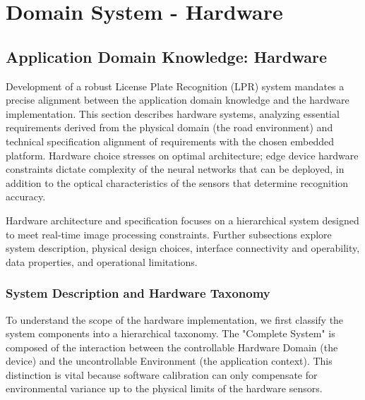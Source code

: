 %
\chapter{Domain System - Hardware} \label{ch:domain_system_hardware}

\section{Application Domain Knowledge: Hardware}
\label{sec:hardware_domain}

Development of a robust License Plate Recognition (LPR) system mandates a precise alignment between the application domain knowledge and the hardware implementation. This section describes hardware systems, analyzing essential requirements derived from the physical domain (the road environment) and technical specification alignment of requirements with the chosen embedded platform. Hardware choice stresses on optimal architecture; edge device hardware constraints dictate complexity of the neural networks that can be deployed, in addition to the optical characteristics of the sensors that determine recognition accuracy.

Hardware architecture and specification focuses on a hierarchical system designed to meet real-time image processing constraints. Further subsections explore system description, physical design choices, interface connectivity and operability, data properties, and operational limitations.

\subsection{System Description and Hardware Taxonomy}

To understand the scope of the hardware implementation, we first classify the system components into a hierarchical taxonomy. The "Complete System" is composed of the interaction between the controllable Hardware Domain (the device) and the uncontrollable Environment (the application context). This distinction is vital because software calibration can only compensate for environmental variance up to the physical limits of the hardware sensors.

